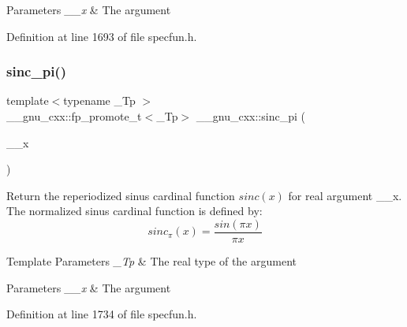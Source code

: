 \begin{DoxyParams}{Parameters}
{\em \+\_\+\+\_\+x} & The argument \\
\hline
\end{DoxyParams}


Definition at line 1693 of file specfun.\+h.

\mbox{\label{group__gnu__math__spec__func_ga5195270024403b985e7d4f2f935f8779}} 
\subsubsection{\texorpdfstring{sinc\+\_\+pi()}{sinc\_pi()}}
{\footnotesize\ttfamily template$<$typename \+\_\+\+Tp $>$ \\
\+\_\+\+\_\+gnu\+\_\+cxx\+::fp\+\_\+promote\+\_\+t$<$\+\_\+\+Tp$>$ \+\_\+\+\_\+gnu\+\_\+cxx\+::sinc\+\_\+pi (\begin{DoxyParamCaption}\item[{\+\_\+\+Tp}]{\+\_\+\+\_\+x }\end{DoxyParamCaption})\hspace{0.3cm}{\ttfamily [inline]}}

Return the reperiodized sinus cardinal function $ sinc(x) $ for real argument {\ttfamily \+\_\+\+\_\+x}. The normalized sinus cardinal function is defined by\+: \[ sinc_\pi(x) = \frac{sin(\pi x)}{\pi x} \]


\begin{DoxyTemplParams}{Template Parameters}
{\em \+\_\+\+Tp} & The real type of the argument \\
\hline
\end{DoxyTemplParams}

\begin{DoxyParams}{Parameters}
{\em \+\_\+\+\_\+x} & The argument \\
\hline
\end{DoxyParams}


Definition at line 1734 of file specfun.\+h.

\mbox{\label{group__gnu__math__spec__func_gad92d43d5332c80d1a27c90bfe3f6417e}} 
